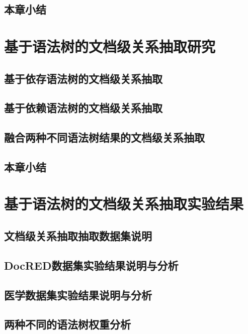 \documentclass[bachelor]{thesis-uestc}
\begin{document}
\section{本章小结}

\newpage

\chapter{基于语法树的文档级关系抽取研究}

\section{基于依存语法树的文档级关系抽取}

\section{基于依赖语法树的文档级关系抽取}

\section{融合两种不同语法树结果的文档级关系抽取}

\section{本章小结}
\newpage
\chapter{基于语法树的文档级关系抽取实验结果}

\section{文档级关系抽取抽取数据集说明}

\section{DocRED数据集实验结果说明与分析}

\section{医学数据集实验结果说明与分析}

\section{两种不同的语法树权重分析}
\end{document}
